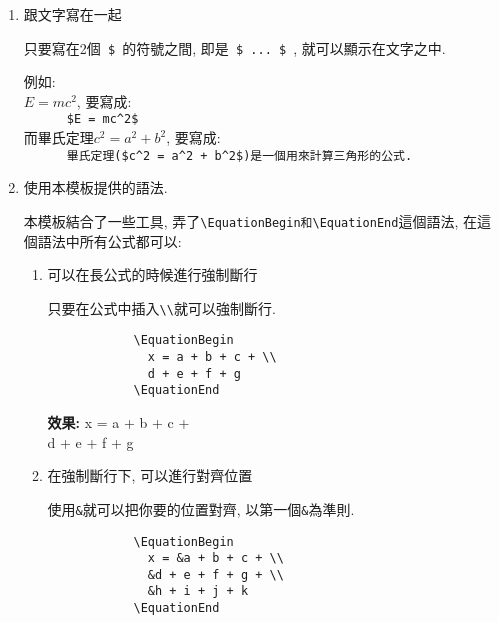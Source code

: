   \begin{enumerate}
    \item
    {
      跟文字寫在一起

      只要寫在2個\verb| $ |的符號之間, 即是\verb| $ ... $ |, 就可以顯示在文字之中.

      \noindent 例如:\\
      $E = mc^2$, 要寫成:\\
      \verb|      $E = mc^2$|\\
      而畢氏定理$c^2 = a^2 + b^2$, 要寫成:\\
      \verb|      畢氏定理($c^2 = a^2 + b^2$)是一個用來計算三角形的公式.|
    } %

    \newpage
    \item
    {
      使用本模板提供的語法.

      本模板結合了一些工具, 弄了\verb|\EquationBegin和\EquationEnd|這個語法, 在這個語法中所有公式都可以:
      \begin{enumerate}
        \item
        {
          可以在長公式的時候進行強制斷行

          只要在公式中插入\verb|\\|就可以強制斷行.
          \begin{verbatim}
            \EquationBegin
              x = a + b + c + \\
              d + e + f + g
            \EquationEnd
          \end{verbatim}

          {\bf 效果:}
          \EquationBegin
            x = a + b + c + \\
            d + e + f + g
          \EquationEnd
        } %

        \label{chapter:how-to:write:equation:label-example}
        \item
        {
          在強制斷行下, 可以進行對齊位置

          使用\verb|&|就可以把你要的位置對齊, 以第一個\verb|&|為準則.
          \begin{verbatim}
            \EquationBegin
              x = &a + b + c + \\
              &d + e + f + g + \\
              &h + i + j + k
            \EquationEnd
          \end{verbatim}

}
\end{enumerate}}
\end{enumerate}
